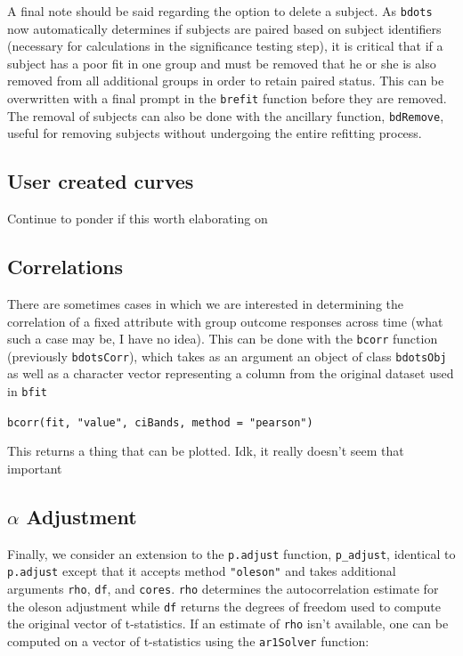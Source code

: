 \documentclass{article}
\newcommand{\xt}{\texttt}%
\begin{document}
A final note should be said regarding the option to delete a subject. As \xt{bdots} now automatically determines if subjects are paired based on subject identifiers (necessary for  calculations in the significance testing step), it is critical that if a subject has a poor fit in one group and must be removed that he or she is also removed from all additional groups in order to retain paired status. This can be overwritten with a final prompt in the \texttt{brefit} function before they are removed. The removal of subjects can also be done with the ancillary function, \texttt{bdRemove}, useful for removing subjects without undergoing the entire refitting process. 


\subsection{User created curves}

Continue to ponder if this worth elaborating on

\subsection{Correlations}

There are sometimes cases in which we are interested in determining the correlation of a fixed attribute with group outcome responses across time (what such a case may be, I have no idea). This can be done with the \texttt{bcorr} function (previously \texttt{bdotsCorr}), which takes as an argument an object of class \texttt{bdotsObj} as well as a character vector representing a column from the original dataset used in \texttt{bfit}

\begin{center}
\texttt{bcorr(fit, "value", ciBands, method = "pearson")} 
\end{center}

This returns a thing that can be plotted. Idk, it really doesn't seem that important 

\subsection{$\alpha$ Adjustment}

Finally, we consider an extension to the \texttt{p.adjust} function, \texttt{p\_adjust}, identical to \texttt{p.adjust} except that it accepts method \texttt{"oleson"} and takes additional arguments \texttt{rho}, \texttt{df}, and \texttt{cores}. \texttt{rho} determines the autocorrelation estimate for the oleson adjustment while \texttt{df} returns the degrees of freedom used to compute the original vector of t-statistics. If an estimate of \texttt{rho} isn't available, one can be computed on a vector of t-statistics using the \texttt{ar1Solver} function:
\end{document}
